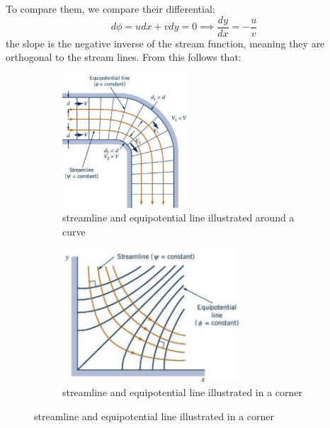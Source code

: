 To compare them, we compare their differential:
\begin{equation*}
	d\phi  = u dx + v dy = 0\implies \frac{d y}{dx} = -\frac{u}v
\end{equation*}
the slope is the negative inverse of the stream function, meaning they are orthogonal to the stream lines. From this follows that:


\begin{figure}[H]
	\centering
	\begin{subfigure}{0.48\linewidth}
		\centering
		\includegraphics[height=5cm]{Sketches/equipotential_lines_1}
		\caption{streamline and equipotential line illustrated around a curve}
		\label{fig:equipotentiallines1}
	\end{subfigure}%
	\hfill
	\begin{subfigure}{0.48\linewidth}
		\centering
		\includegraphics[height=5cm]{Sketches/equipotential_lines_2}
		\caption{streamline and equipotential line illustrated in a corner}
		\label{fig:equipotentiallines2}
	\end{subfigure}
\end{figure}

